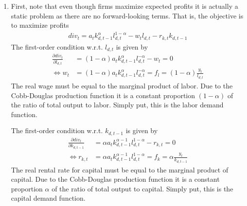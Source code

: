 \begin{enumerate}
(I) and (III) in (IV) yields
\begin{align*}
\underbrace{\gamma c_t^{-1}}_{U_{c,t}} &= \beta E_t \underbrace{\gamma c_{t+1}^{-1}}_{U_{c,t+1}}\left(1 - \delta + r_{k,t+1}\right)
\end{align*}
This is the Euler equation of \textbf{intertemporal optimality}.
It reflects the trade-off between consumption and savings.
If the household saves a (marginal) unit of consumption, i.e.\ invest this into the capital stock,
  she can consume \((1-\delta+r_{k,t+1})\) units in the following period.
The marginal utility of consuming a unit today is equal to \(U_{c,t}\),
  whereas consuming tomorrow has expected utility equal to \(E_t(U_{c,t+1})\).
Discounting expected marginal utility with \(\beta \), an optimum is characterized by a situation
  in which the household must be indifferent between both choices.

(I) in (II) yields:
\begin{align*}
w_t = -\frac{\frac{-\psi}{1-l_t}}{\gamma c_t^{-1}} \equiv - \frac{U_{l,t}}{U_{c,t}}
\end{align*}
This equation reflects \textbf{intratemporal optimality}; in other words, the labor supply function.
According to the equation, the real wage must be equal to the marginal rate of substitution between consumption and leisure.

\item First, note that even though firms maximize expected profits it is actually a static problem as there are no forward-looking terms.
That is, the objective is to maximize profits
\begin{align*}
{div}_t = a_t k_{d,t-1}^\alpha l_{d,t}^{1-\alpha} - w_t l_{d,t} - r_{k,t} k_{d,t-1}
\end{align*}
The first-order condition w.r.t.
\(l_{d,t}\) is given by
\begin{align*}
\frac{\partial {div}_t}{\partial l_{d,t}} &= (1-\alpha) a_t k_{d,t-1}^\alpha l_{d,t}^{-\alpha} - w_t = 0
\\
\Leftrightarrow w_t &= (1-\alpha) a_t k_{d,t-1}^\alpha l_{d,t}^{-\alpha} = f_l = (1-\alpha) \frac{y_t}{l_{d,t}}
\end{align*}
The real wage must be equal to the marginal product of labor.
Due to the Cobb-Douglas production function it is a constant proportion \((1-\alpha)\) of the ratio of total output to labor.
Simply put, this is the labor demand function.

The first-order condition w.r.t.
\(k_{d,t-1}\) is given by
\begin{align*}
\frac{\partial {div}_t}{\partial k_{d,t-1}} &= \alpha a_t k_{d,t-1}^{\alpha-1} l_{d,t}^{1-\alpha} - r_{k,t} = 0
\\
\Leftrightarrow r_{k,t} &= \alpha a_t k_{d,t-1}^{\alpha-1} l_{d,t}^{1-\alpha} = f_k = \alpha \frac{y_t}{k_{d,t-1}}
\end{align*}
The real rental rate for capital must be equal to the marginal product of capital.
Due to the Cobb-Douglas production function it is a constant proportion \(\alpha \) of the ratio of total output to capital.
Simply put, this is the capital demand function.


\end{enumerate}
